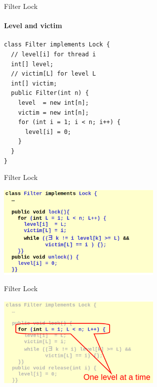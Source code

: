 \begin{frame}[fragile]{Filter Lock}
\framesubtitle{Level and victim}

\begin{verbatim}
class Filter implements Lock {
  // level[i] for thread i
  int[] level;  
  // victim[L] for level L
  int[] victim; 
  public Filter(int n) {
    level  = new int[n];
    victim = new int[n]; 
    for (int i = 1; i < n; i++) {
      level[i] = 0;
    }
  }
}
\end{verbatim}


\end{frame}


\begin{frame}[fragile,t]{Filter Lock}
\begin{center}
  \includegraphics[width=0.6\textwidth]{./pics/filter/f1.png}
\end{center}
\end{frame}

\begin{frame}{Filter Lock}
\begin{center}
  \includegraphics[width=0.6\textwidth]{./pics/filter/f2.png}
\end{center}
\end{frame}

